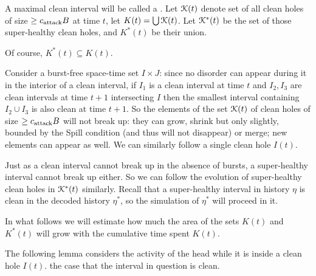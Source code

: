 \documentclass[11pt]{memoir}
\theoremstyle{definition} %
\renewcommand{\ge}{\geq}
\def\B{B}
\newcommand{\cns}[1]{c_{\textrm{\upshape #1}}}
\newcommand{\CAtt}{\cns{attack}}
\begin{document}
\begin{definition}
  A maximal clean interval will be called a .
  Let \( \mathcal{K}(t) \) denote set of all clean holes of size \( \ge\CAtt\B \) at time \( t \),
  let \( K(t)=\bigcup \mathcal{K}(t) \).
  Let \( \mathcal{K}^{*}(t) \) be the set of those super-healthy clean holes, and \( K^{*}(t) \) be their union.
\end{definition}

Of course, \( K^{*}(t)\subseteq K(t) \).

Consider a burst-free space-time set \( I\times J \): since 
no disorder can appear during it in the interior of a clean interval,
if \( I_{1} \) is a clean interval at time \( t \) and \( I_{2}, I_{3} \) are clean intervals at time \( t+1 \)
intersecting \( I \) then the smallest interval containing \( I_{2}\cup I_{3} \) is also clean at time \( t+1 \).
So the elements of the set \( \mathcal{K}(t) \) of clean holes of size \( \ge\CAtt\B \)
will not break up: they can grow, shrink but only slightly, bounded by the Spill condition
(and thus will not disappear) or merge; new elements can appear as well.
We can similarly follow a single clean hole \( I(t) \).

Just as a clean interval cannot break up in the absence of bursts, a super-healthy
interval cannot break up either.
So we can follow the evolution of super-healthy clean holes in \( \mathcal{K}^{*}(t) \) similarly.
Recall that a super-healthy interval in history \( \eta \) is clean in the decoded history \( \eta^{*} \),
so the simulation of \( \eta^{*} \) will proceed in it.

In what follows we will estimate how much the area of the sets \( K(t) \) and \( K^{*}(t) \)
will grow with the cumulative time spent \( K(t) \).

The following lemma considers the activity of the head while it is inside a clean hole \( I(t) \).
the case that the interval in question is clean.
\end{document}
